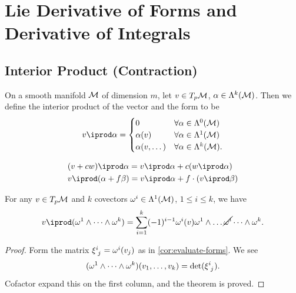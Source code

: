 \documentclass[../main.tex]{subfiles}
\begin{document}
    \section{Lie Derivative of Forms and Derivative of Integrals}
    \subsection{Interior Product (Contraction)}
    \begin{definition}\label{def:iprod}
        On a smooth manifold \(\manifold[M]\) of dimension \(m\), let \(v \in 
        T_p\manifold[M]\), \(\alpha \in \form{k}{M}\). Then we 
        define the interior product of the vector and the form to be 
        \[
        v \iprod \alpha=
        \begin{cases}
        0 & \forall \alpha \in \form{0}{M}\\
        \alpha(v) & \forall \alpha \in \form{1}{M}\\
        \alpha(v, \dots) & \forall \alpha \in \form{k}{M}.
        \end{cases}
        \]
    \end{definition}
    \begin{theorem}\label{thm:iprod-properties}
        \[
        \begin{aligned}
            &(v+cw)\iprod \alpha = v\iprod\alpha + c(w\iprod\alpha)\\
            &v \iprod (\alpha + f\beta) = v\iprod \alpha + f\cdot(v\iprod \beta)
        \end{aligned}
        \]
    \end{theorem}
    \begin{theorem}\label{thm:iprod-cofactor}
        For any \(v \in T_p\manifold[M]\) and \(k\) covectors \(\omega^i \in 
        \form{1}{M}\), \(1 \leq i \leq k\), we have 
        \[
        v\iprod(\omega^1\wedge \dots \wedge \omega^k)=
        \sum_{i=1}^{k} (-1)^{i-1}\omega^i(v)\omega^1\wedge \dots \cancel{\omega^i}
        \dots\wedge\omega^k.
        \]
    \end{theorem}
    \begin{proof}
        Form the matrix \(\xi\indices{^i_j}=\omega^i(v_j)\) as in 
        \cref{cor:evaluate-forms}. We see 
        \[
        (\omega^1\wedge \dots \wedge \omega^k)(v_1, \dots, v_k)
        =\det (\xi\indices{^i_j}).
        \]
        Cofactor expand this on the first column, and the theorem is proved.
    \end{proof}
\end{document}
